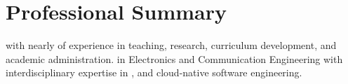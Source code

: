 \vspace{-2.5em}\section{Professional Summary}
 with nearly  of experience in teaching, research, curriculum development, and academic administration.  in Electronics and Communication Engineering with interdisciplinary expertise in , and cloud-native software engineering.

\sectionline
